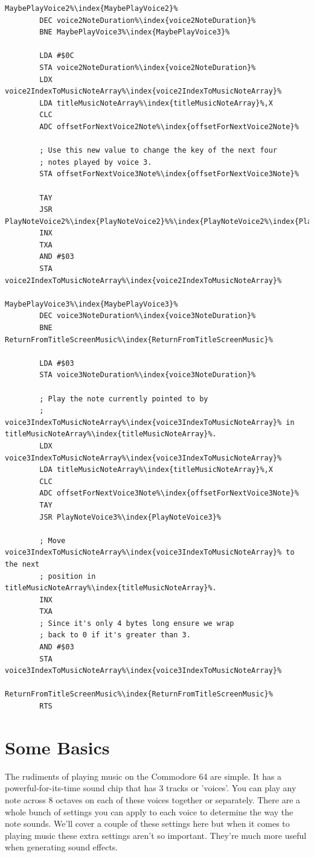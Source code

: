 \begin{lstlisting}[caption=Routine responsible for playing the title tune.,escapechar=\%]
MaybePlayVoice2%\index{MaybePlayVoice2}%   
        DEC voice2NoteDuration%\index{voice2NoteDuration}%
        BNE MaybePlayVoice3%\index{MaybePlayVoice3}%

        LDA #$0C
        STA voice2NoteDuration%\index{voice2NoteDuration}%
        LDX voice2IndexToMusicNoteArray%\index{voice2IndexToMusicNoteArray}%
        LDA titleMusicNoteArray%\index{titleMusicNoteArray}%,X
        CLC
        ADC offsetForNextVoice2Note%\index{offsetForNextVoice2Note}%

        ; Use this new value to change the key of the next four
        ; notes played by voice 3. 
        STA offsetForNextVoice3Note%\index{offsetForNextVoice3Note}%

        TAY
        JSR PlayNoteVoice2%\index{PlayNoteVoice2}%%\index{PlayNoteVoice2%\index{PlayNoteVoice2}%}%
        INX
        TXA
        AND #$03
        STA voice2IndexToMusicNoteArray%\index{voice2IndexToMusicNoteArray}%

MaybePlayVoice3%\index{MaybePlayVoice3}%   
        DEC voice3NoteDuration%\index{voice3NoteDuration}%
        BNE ReturnFromTitleScreenMusic%\index{ReturnFromTitleScreenMusic}%

        LDA #$03
        STA voice3NoteDuration%\index{voice3NoteDuration}%

        ; Play the note currently pointed to by 
        ; voice3IndexToMusicNoteArray%\index{voice3IndexToMusicNoteArray}% in titleMusicNoteArray%\index{titleMusicNoteArray}%.
        LDX voice3IndexToMusicNoteArray%\index{voice3IndexToMusicNoteArray}%
        LDA titleMusicNoteArray%\index{titleMusicNoteArray}%,X
        CLC
        ADC offsetForNextVoice3Note%\index{offsetForNextVoice3Note}%
        TAY
        JSR PlayNoteVoice3%\index{PlayNoteVoice3}%

        ; Move voice3IndexToMusicNoteArray%\index{voice3IndexToMusicNoteArray}% to the next
        ; position in titleMusicNoteArray%\index{titleMusicNoteArray}%.
        INX
        TXA
        ; Since it's only 4 bytes long ensure we wrap
        ; back to 0 if it's greater than 3.
        AND #$03
        STA voice3IndexToMusicNoteArray%\index{voice3IndexToMusicNoteArray}%

ReturnFromTitleScreenMusic%\index{ReturnFromTitleScreenMusic}%   
        RTS
\end{lstlisting}

\section{Some Basics}
The rudiments of playing music on the Commodore 64 are simple. It has a powerful-for-its-time
sound chip that has 3 tracks or 'voices'. You can play any note across 8 octaves on each of
these voices together or separately. There are a whole bunch of settings you can apply
to each voice to determine the way the note sounds. We'll cover a couple of these settings
here but when it comes to playing music these extra settings aren't so important. They're
much more useful when generating sound effects.

